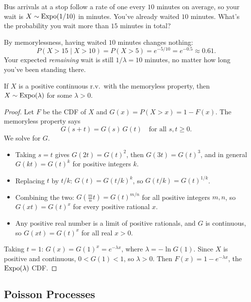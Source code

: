 \begin{example}
  Bus arrivals at a stop follow a rate of one every $10$ minutes on average, so your wait is $X \sim \operatorname{Expo}(1/10)$ in minutes. You've already waited $10$ minutes. What's the probability you wait more than $15$ minutes in total?
\end{example}

\begin{solution}
  By memorylessness, having waited $10$ minutes changes nothing:
  \[
    P(X > 15 \mid X > 10) = P(X > 5) = e^{-5/10} = e^{-0.5} \approx 0.61.
  \]
  Your expected \emph{remaining} wait is still $1/\lambda = 10$ minutes, no matter how long you've been standing there.
\end{solution}

\begin{theorem}\label{thm:memorylessexpo}
  If $X$ is a positive continuous r.v.\ with the memoryless property, then $X \sim \operatorname{Expo}(\lambda)$ for some $\lambda > 0$.
\end{theorem}

\begin{proof}
  Let $F$ be the CDF of $X$ and $G(x) = P(X > x) = 1 - F(x)$. The memoryless property says
  \[
    G(s + t) = G(s)\,G(t) \quad \text{for all } s, t \ge 0.
  \]
  We solve for $G$.
  \begin{itemize}
    \item Taking $s = t$ gives $G(2t) = G(t)^{2}$, then $G(3t) = G(t)^{3}$, and in general $G(kt) = G(t)^{k}$ for positive integers $k$.
    \item Replacing $t$ by $t/k$: $G(t) = G(t/k)^{k}$, so $G(t/k) = G(t)^{1/k}$.
    \item Combining the two: $G\!\left(\frac{m}{n}t\right) = G(t)^{m/n}$ for all positive integers $m, n$, so $G(xt) = G(t)^{x}$ for every positive rational $x$.
    \item Any positive real number is a limit of positive rationals, and $G$ is continuous, so $G(xt) = G(t)^{x}$ for all real $x > 0$.
  \end{itemize}
  Taking $t = 1$: $G(x) = G(1)^{x} = e^{-\lambda x}$, where $\lambda = -\ln G(1)$. Since $X$ is positive and continuous, $0 < G(1) < 1$, so $\lambda > 0$. Then $F(x) = 1 - e^{-\lambda x}$, the $\operatorname{Expo}(\lambda)$ CDF.
\end{proof}



\subsection{Poisson Processes}

